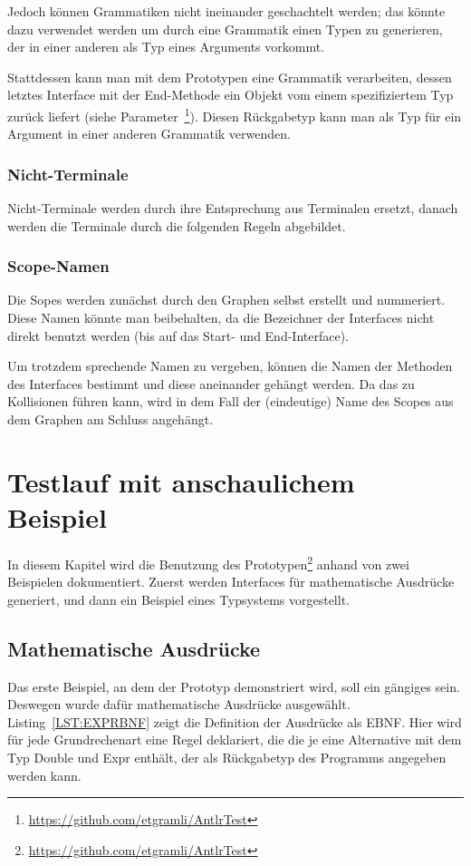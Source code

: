 \documentclass[../InterneDSLs.tex]{subfiles}
\begin{document}
Jedoch können Grammatiken nicht ineinander geschachtelt werden; das könnte dazu verwendet werden um durch eine Grammatik einen Typen zu generieren, der in einer anderen als Typ eines Arguments vorkommt.

Stattdessen kann man mit dem Prototypen eine Grammatik verarbeiten, dessen letztes Interface mit der End-Methode ein Objekt vom einem spezifiziertem Typ zurück liefert (siehe Parameter~\footnote{\url{https://github.com/etgramli/AntlrTest}}). Diesen Rückgabetyp kann man als Typ für ein Argument in einer anderen Grammatik verwenden.

\subsection{Nicht-Terminale}
Nicht-Terminale werden durch ihre Entsprechung aus Terminalen ersetzt, danach werden die Terminale durch die folgenden Regeln abgebildet.

\subsection{Scope-Namen}
Die Sopes werden zunächst durch den Graphen selbst erstellt und nummeriert. Diese Namen könnte man beibehalten, da die Bezeichner der Interfaces nicht direkt benutzt werden (bis auf das Start- und End-Interface).

Um trotzdem sprechende Namen zu vergeben, können die Namen der Methoden des Interfaces bestimmt und diese aneinander gehängt werden. Da das zu Kollisionen führen kann, wird in dem Fall der (eindeutige) Name des Scopes aus dem Graphen am Schluss angehängt.


\chapter{Testlauf mit anschaulichem Beispiel}\label{SEC:Example}
In diesem Kapitel wird die Benutzung des Prototypen\footnote{\url{https://github.com/etgramli/AntlrTest}} anhand von zwei Beispielen dokumentiert. Zuerst werden Interfaces für mathematische Ausdrücke generiert, und dann ein Beispiel eines Typsystems vorgestellt.

\section{Mathematische Ausdrücke}
Das erste Beispiel, an dem der Prototyp demonstriert wird, soll ein gängiges sein. Deswegen wurde dafür mathematische Ausdrücke ausgewählt. Listing~\ref{LST:EXPRBNF} zeigt die Definition der Ausdrücke als EBNF. Hier wird für jede Grundrechenart eine Regel deklariert, die die je eine Alternative mit dem Typ Double und Expr enthält, der als Rückgabetyp des Programms angegeben werden kann.
\end{document}
